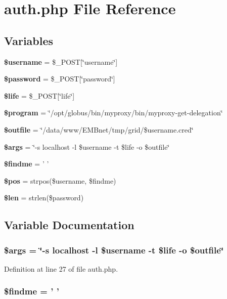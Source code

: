 \section{auth.php File Reference}
\label{auth_8php}
\subsection*{Variables}
\begin{CompactItemize}
\item 
{\bf \$username} = \$\_\-POST[\char`\"{}username\char`\"{}]
\item 
{\bf \$password} = \$\_\-POST[\char`\"{}password\char`\"{}]
\item 
{\bf \$life} = \$\_\-POST[\char`\"{}life\char`\"{}]
\item 
{\bf \$program} = \char`\"{}/opt/globus/bin/myproxy/bin/myproxy-get-delegation\char`\"{}
\item 
{\bf \$outfile} = \char`\"{}/data/www/EMBnet/tmp/grid/\$username.cred\char`\"{}
\item 
{\bf \$args} = \char`\"{}-s localhost -l \$username -t \$life -o \$outfile\char`\"{}
\item 
{\bf \$findme} = ' '
\item 
{\bf \$pos} = strpos(\$username, \$findme)
\item 
{\bf \$len} = strlen(\$password)
\end{CompactItemize}


\subsection{Variable Documentation}
\subsubsection{\setlength{\rightskip}{0pt plus 5cm}\$args = \char`\"{}-s localhost -l \$username -t \$life -o \$outfile\char`\"{}}\label{auth_8php_a5}




Definition at line 27 of file auth.php.
\subsubsection{\setlength{\rightskip}{0pt plus 5cm}\$findme = ' '}\label{auth_8php_a6}





